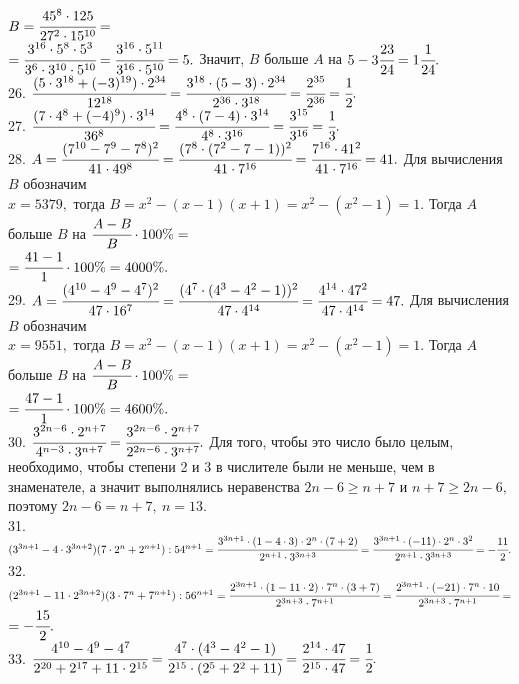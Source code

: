 $B=\cfrac{45^8\cdot125}{27^2\cdot15^{10}}=$\\$=\cfrac{3^{16}\cdot5^{8}\cdot5^3}{3^6\cdot3^{10}\cdot5^{10}}=\cfrac{3^{16}\cdot5^{11}}{3^{16}\cdot5^{10}}=5.$ Значит, $B$ больше $A$ на $5-3\cfrac{23}{24}=1\cfrac{1}{24}.$\\
26. $\cfrac{(5\cdot3^{18}+(-3)^{19})\cdot2^{34}}{12^{18}}=\cfrac{3^{18}\cdot(5-3)\cdot2^{34}}{2^{36}\cdot3^{18}}=\cfrac{2^{35}}{2^{36}}=\cfrac{1}{2}.$\\
27. $\cfrac{(7\cdot4^8+(-4)^9)\cdot3^{14}}{36^8}=\cfrac{4^8\cdot(7-4)\cdot3^{14}}{4^8\cdot3^{16}}=\cfrac{3^{15}}{3^{16}}=\cfrac{1}{3}.$\\
28. $A=\cfrac{(7^{10}-7^9-7^8)^2}{41\cdot49^8}=\cfrac{(7^8\cdot(7^2-7-1))^2}{41\cdot7^{16}}=\cfrac{7^{16}\cdot41^2}{41\cdot7^{16}}=41.$ Для вычисления $B$ обозначим\\ $x=5379,$ тогда $B=x^2-(x-1)(x+1)=x^2-(x^2-1)=1.$ Тогда $A$ больше $B$ на $\cfrac{A-B}{B}\cdot100\%=$\\$=\cfrac{41-1}{1}\cdot100\%=4000\%.$\\
29. $A=\cfrac{(4^{10}-4^9-4^7)^2}{47\cdot16^7}=\cfrac{(4^7\cdot(4^3-4^2-1))^2}{47\cdot4^{14}}=\cfrac{4^{14}\cdot47^2}{47\cdot4^{14}}=47.$ Для вычисления $B$ обозначим\\ $x=9551,$ тогда $B=x^2-(x-1)(x+1)=x^2-(x^2-1)=1.$ Тогда $A$ больше $B$ на $\cfrac{A-B}{B}\cdot100\%=$\\$=\cfrac{47-1}{1}\cdot100\%=4600\%.$\\
30. $\cfrac{3^{2n-6}\cdot2^{n+7}}{4^{n-3}\cdot3^{n+7}}=\cfrac{3^{2n-6}\cdot2^{n+7}}{2^{2n-6}\cdot3^{n+7}}.$ Для того, чтобы это число было целым, необходимо, чтобы степени 2 и 3 в числителе были не меньше, чем в знаменателе, а значит выполнялись неравенства $2n-6\geqslant n+7$ и $n+7\geqslant 2n-6,$ поэтому $2n-6=n+7,\ n=13.$\\
31. $(3^{3n+1}-4\cdot3^{3n+2})(7\cdot2^n+2^{n+1}):54^{n+1}=\cfrac{3^{3n+1}\cdot(1-4\cdot3)\cdot2^n\cdot(7+2)}{2^{n+1}\cdot3^{3n+3}}=
\cfrac{3^{3n+1}\cdot(-11)\cdot2^n\cdot3^2}{2^{n+1}\cdot3^{3n+3}}=-\cfrac{11}{2}.$\\
32. $(2^{3n+1}-11\cdot2^{3n+2})(3\cdot7^n+7^{n+1}):56^{n+1}=\cfrac{2^{3n+1}\cdot(1-11\cdot2)\cdot7^n\cdot(3+7)}{2^{3n+3}\cdot7^{n+1}}=
\cfrac{2^{3n+1}\cdot(-21)\cdot7^n\cdot10}{2^{3n+3}\cdot7^{n+1}}=$\\$=-\cfrac{15}{2}.$\\
33. $\cfrac{4^{10}-4^9-4^7}{2^{20}+2^{17}+11\cdot2^{15}}=\cfrac{4^7\cdot(4^3-4^2-1)}{2^{15}\cdot(2^5+2^2+11)}=
\cfrac{2^{14}\cdot47}{2^{15}\cdot47}=\cfrac{1}{2}.$\\
